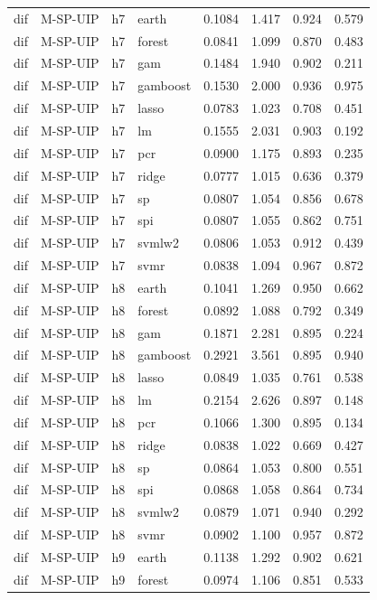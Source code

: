 \begin{ThreePartTable}
\begin{longtable}[t]{llclcccc}
dif & M-SP-UIP & h7 & earth & 0.1084 & 1.417 & 0.924 & 0.579\\
dif & M-SP-UIP & h7 & forest & 0.0841 & 1.099 & 0.870 & 0.483\\
dif & M-SP-UIP & h7 & gam & 0.1484 & 1.940 & 0.902 & 0.211\\
dif & M-SP-UIP & h7 & gamboost & 0.1530 & 2.000 & 0.936 & 0.975\\
dif & M-SP-UIP & h7 & lasso & 0.0783 & 1.023 & 0.708 & 0.451\\
dif & M-SP-UIP & h7 & lm & 0.1555 & 2.031 & 0.903 & 0.192\\
dif & M-SP-UIP & h7 & pcr & 0.0900 & 1.175 & 0.893 & 0.235\\
dif & M-SP-UIP & h7 & ridge & 0.0777 & 1.015 & 0.636 & 0.379\\
dif & M-SP-UIP & h7 & sp & 0.0807 & 1.054 & 0.856 & 0.678\\
dif & M-SP-UIP & h7 & spi & 0.0807 & 1.055 & 0.862 & 0.751\\
dif & M-SP-UIP & h7 & svmlw2 & 0.0806 & 1.053 & 0.912 & 0.439\\
dif & M-SP-UIP & h7 & svmr & 0.0838 & 1.094 & 0.967 & 0.872\\
\addlinespace
dif & M-SP-UIP & h8 & earth & 0.1041 & 1.269 & 0.950 & 0.662\\
dif & M-SP-UIP & h8 & forest & 0.0892 & 1.088 & 0.792 & 0.349\\
dif & M-SP-UIP & h8 & gam & 0.1871 & 2.281 & 0.895 & 0.224\\
dif & M-SP-UIP & h8 & gamboost & 0.2921 & 3.561 & 0.895 & 0.940\\
dif & M-SP-UIP & h8 & lasso & 0.0849 & 1.035 & 0.761 & 0.538\\
dif & M-SP-UIP & h8 & lm & 0.2154 & 2.626 & 0.897 & 0.148\\
dif & M-SP-UIP & h8 & pcr & 0.1066 & 1.300 & 0.895 & 0.134\\
dif & M-SP-UIP & h8 & ridge & 0.0838 & 1.022 & 0.669 & 0.427\\
dif & M-SP-UIP & h8 & sp & 0.0864 & 1.053 & 0.800 & 0.551\\
dif & M-SP-UIP & h8 & spi & 0.0868 & 1.058 & 0.864 & 0.734\\
dif & M-SP-UIP & h8 & svmlw2 & 0.0879 & 1.071 & 0.940 & 0.292\\
dif & M-SP-UIP & h8 & svmr & 0.0902 & 1.100 & 0.957 & 0.872\\
\addlinespace
dif & M-SP-UIP & h9 & earth & 0.1138 & 1.292 & 0.902 & 0.621\\
dif & M-SP-UIP & h9 & forest & 0.0974 & 1.106 & 0.851 & 0.533\\

\end{longtable}
\end{ThreePartTable}
